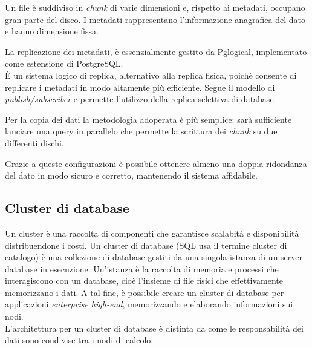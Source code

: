 Un file \`{e} suddiviso in \textit{chunk} di varie dimensioni e, rispetto ai metadati, occupano gran parte del disco. I metadati rappresentano l'informazione anagrafica del dato e hanno dimensione fissa.

La replicazione dei metadati, \`{e} essenzialmente gestito da Pglogical, implementato come estensione di PostgreSQL. \\
\`{E} un sistema logico di replica, alternativo alla replica fisica, poich\`{e} consente di replicare i metadati in modo altamente pi\`{u} efficiente. Segue il modello di \textit{publish/subscriber} e permette l'utilizzo della replica selettiva di database.

Per la copia dei dati la metodologia adoperata \`{e} pi\`{u} semplice: sar\`{a} sufficiente lanciare una query in parallelo che permette la scrittura dei \textit{chunk} su due differenti dischi.

Grazie a queste configurazioni \`{e} possibile ottenere almeno una doppia ridondanza del dato in modo sicuro e corretto, mantenendo il sistema affidabile.

\item
\subsection{Cluster di database}
Un cluster \`{e} una raccolta di componenti che garantisce scalabit\`{a} e disponibilit\`{a} distribuendone i costi. Un cluster di database (SQL usa il termine cluster di catalogo) \`{e} una collezione di database gestiti da una singola istanza di un server database in esecuzione. Un'istanza \`{e} la raccolta di memoria e processi che interagiscono con un database, cio\`{e} l'insieme di file fisici che effettivamente memorizzano i dati\cite{etichetta1}. A tal fine, \`{e} possibile creare un cluster di database per applicazioni \textit{enterprise high-end}, memorizzando e elaborando informazioni sui nodi.\\ L'architettura per un cluster di database \`{e} distinta da come le responsabilit\`{a} dei dati sono condivise tra i nodi di calcolo.

